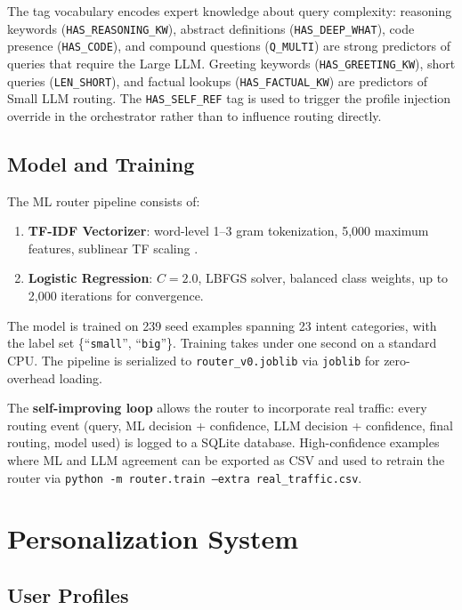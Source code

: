 \documentclass{article}
\begin{document}
The tag vocabulary encodes expert knowledge about query complexity: reasoning
keywords (\texttt{HAS\_REASONING\_KW}), abstract definitions (\texttt{HAS\_DEEP\_WHAT}),
code presence (\texttt{HAS\_CODE}), and compound questions (\texttt{Q\_MULTI}) are strong
predictors of queries that require the Large LLM. Greeting keywords
(\texttt{HAS\_GREETING\_KW}), short queries (\texttt{LEN\_SHORT}), and factual
lookups (\texttt{HAS\_FACTUAL\_KW}) are predictors of Small LLM routing.
The \texttt{HAS\_SELF\_REF} tag is used to trigger the profile injection
override in the orchestrator rather than to influence routing directly.

\subsection{Model and Training}
\label{sec:training}

The ML router pipeline consists of:
\begin{enumerate}
    \item \textbf{TF-IDF Vectorizer}: word-level 1--3 gram tokenization,
          5,000 maximum features, sublinear TF scaling
          \citep{sparckjones1972tfidf}.
    \item \textbf{Logistic Regression}: $C=2.0$, LBFGS solver, balanced class
          weights, up to 2,000 iterations for convergence.
\end{enumerate}

The model is trained on 239 seed examples spanning 23 intent categories, with
the label set \{``\texttt{small}'', ``\texttt{big}''\}. Training takes under
one second on a standard CPU. The pipeline is serialized to
\texttt{router\_v0.joblib} via \texttt{joblib} for zero-overhead loading.

The \textbf{self-improving loop} allows the router to incorporate real traffic:
every routing event (query, ML decision + confidence, LLM decision + confidence,
final routing, model used) is logged to a SQLite database. High-confidence
examples where ML and LLM agreement can be exported as CSV and used to
retrain the router via \texttt{python -m router.train --extra real\_traffic.csv}.

\section{Personalization System}
\label{sec:personalization}

\subsection{User Profiles}
\label{sec:profiles}
\end{document}
